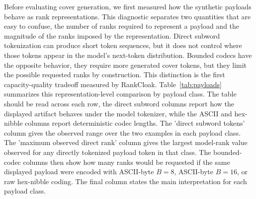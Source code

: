 \documentclass[fleqn,10pt]{wlscirep}
\begin{document}
Before evaluating cover generation, we first measured how the synthetic payloads behave as rank representations. This diagnostic separates two quantities that are easy to confuse, the number of ranks required to represent a payload and the magnitude of the ranks imposed by the representation. Direct subword tokenization can produce short token sequences, but it does not control where those tokens appear in the model's next-token distribution. Bounded codecs have the opposite behavior, they require more generated cover tokens, but they limit the possible requested ranks by construction. This distinction is the first capacity-quality tradeoff measured by RankCloak.
 Table~\ref{tab:payloads} summarizes this representation-level comparison by payload class. The table should be read across each row, the direct subword columns report how the displayed artifact behaves under the model tokenizer, while the ASCII and hex-nibble columns report deterministic codec lengths. The 'direct subword tokens' column gives the observed range over the two examples in each payload class. The 'maximum observed direct rank' column gives the largest model-rank value observed for any directly tokenized payload token in that class. The bounded-codec columns then show how many ranks would be requested if the same displayed payload were encoded with ASCII-byte \(B=8\), ASCII-byte \(B=16\), or raw hex-nibble coding. The final column states the main interpretation for each payload class.
\end{document}
